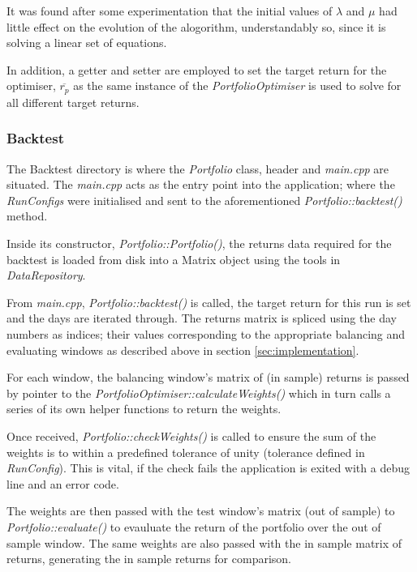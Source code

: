 \documentclass{article}
\begin{document}
It was found after some experimentation that the initial values of $\lambda$ and $\mu$ had little effect on the evolution of the alogorithm, understandably so, since it is solving a linear set of equations.

In addition, a getter and setter are employed to set the target return for the optimiser, $\overline{r_p}$ as the same instance of the \textit{PortfolioOptimiser} is used to solve for all different target returns.



\subsubsection{Backtest}
\label{sec:backtestcode}

The Backtest directory is where the \textit{Portfolio} class, header and \textit{main.cpp} are situated. The \textit{main.cpp} acts as the entry point into the application; where the \textit{RunConfigs} were initialised and sent to the aforementioned \textit{Portfolio::backtest()} method.

Inside its constructor, \textit{Portfolio::Portfolio()}, the returns data required for the backtest is loaded from disk into a Matrix object using the tools in \textit{DataRepository}.

From \textit{main.cpp}, \textit{Portfolio::backtest()} is called, the target return for this run is set and the days are iterated through. The returns matrix is spliced using the day numbers as indices; their values corresponding to the appropriate balancing and evaluating windows as described above in section \ref{sec:implementation}.

For each window, the balancing window's matrix of (in sample) returns is passed by pointer to the \textit{PortfolioOptimiser::calculateWeights()} which in turn calls a series of its own helper functions to return the weights. 

Once received, \textit{Portfolio::checkWeights()} is called to ensure the sum of the weights is to within a predefined tolerance of unity (tolerance defined in \textit{RunConfig}). This is vital, if the check fails the application is exited with a debug line and an error code. 

The weights are then passed with the test window's matrix (out of sample) to \textit{Portfolio::evaluate()} to evauluate the return of the portfolio over the out of sample window. The same weights are also passed with the in sample matrix of returns, generating the in sample returns for comparison.
\end{document}
